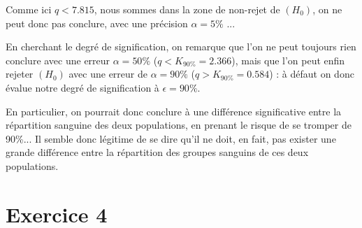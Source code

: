 \documentclass[a4paper,oneside,12pt]{article}
\theoremstyle{plain}
\begin{document}
\begin{enumerate}
    Comme ici $q<7.815$, nous sommes dans la zone de non-rejet de $(H_0)$, on ne peut donc pas conclure, avec une précision $\alpha = 5\%$ ...

    En cherchant le degré de signification, on remarque que l'on ne peut toujours rien conclure avec une erreur $\alpha = 50\%$ ($q<K_{90\%} = 2.366$), mais que l'on peut enfin rejeter $(H_{0})$ avec une erreur de $\alpha = 90\%$ ($q>K_{90\%} = 0.584$) : à défaut on donc évalue notre degré de signification à $\epsilon = 90\%$.

    En particulier, on pourrait donc conclure à une différence significative entre la répartition sanguine des deux populations, en prenant le risque de se tromper de 90\%... Il semble donc légitime de se dire qu'il ne doit, en fait, pas exister une grande différence entre la répartition des groupes sanguins de ces deux populations.
    
\end{enumerate}


\section*{Exercice 4}
\end{document}
